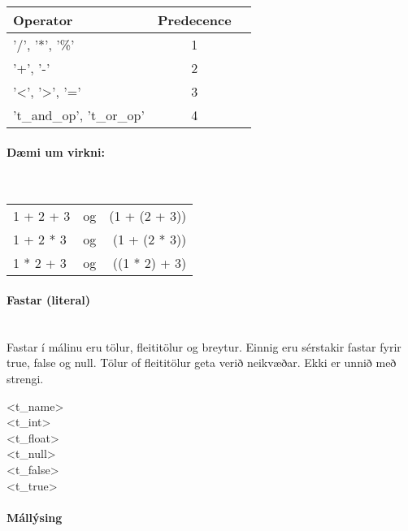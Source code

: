 \documentclass{article}
\begin{document}
\begin{tabular}{ l c r }
Operator & Predecence \\
\hline
'/', '*', '\%' & 1 \\
'+', '-' & 2 \\
'\textless', '\textgreater', '=' & 3 \\
't_and_op', 't_or_op' & 4 \\
\end{tabular}

\paragraph{Dæmi um virkni:} ~\\

\begin{tabular}{ l c r }
1 + 2 + 3 & og & (1 + (2 + 3)) \\
1 + 2 * 3 & og & (1 + (2 * 3)) \\
1 * 2 + 3 & og & ((1 * 2) + 3) \\
\end{tabular}

\paragraph{Fastar (literal)} ~\\

Fastar í málinu eru tölur, fleititölur og breytur. Einnig eru sérstakir fastar fyrir true, false og null.
Tölur of fleititölur geta verið neikvæðar. Ekki er unnið með strengi.

\begin{syntdiag}
\begin{stack}
	<t_name> \\ <t_int> \\ <t_float> \\ <t_null> \\ <t_false> \\ <t_true>
\end{stack}
\end{syntdiag}

\clearpage
\paragraph{{\Large Mállýsing}}

\setlength{\grammarparsep}{20pt plus 1pt minus 1pt} %
\setlength{\grammarindent}{12em} %
\end{document}
